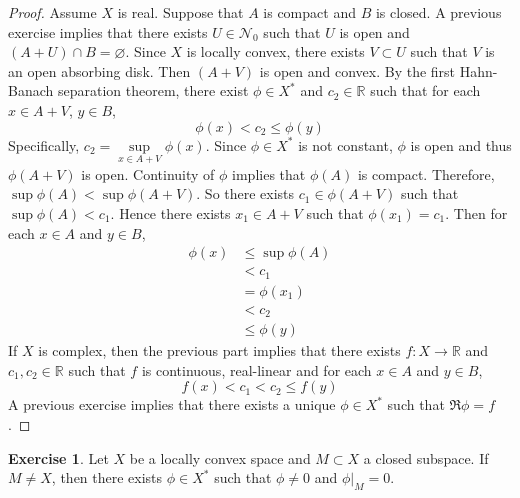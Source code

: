 \documentclass[12pt]{amsart}
\theoremstyle{definition}
\newtheorem{ex}[definition]{Exercise}
\newcommand{\R}{\mathbb{R}}
\newcommand{\MN}{\mathcal{N}}
\DeclareMathOperator*{\0}{\mbf{0}}
\DeclareMathOperator*{\1}{\mbf{1}}
\begin{document}
	\begin{proof}
		Assume $X$ is real. Suppose that $A$ is compact and $B$ is closed. A previous exercise implies that there exists $U \in \MN_0$ such that $U$ is open and $(A + U) \cap B = \varnothing$. Since $X$ is locally convex, there exists $V \subset U$ such that $V$ is an open  absorbing disk. Then $(A + V)$ is open and convex. By the first Hahn-Banach separation theorem, there exist $\phi \in X^*$ and $c_2 \in \R$ such that for each $x \in A + V$, $y \in B$, $$\phi(x) < c_2 \leq \phi(y)$$
		Specifically, $c_2 = \sup\limits_{x \in A + V} \phi(x)$. Since $\phi \in X^*$ is not constant, $\phi$ is open and thus $\phi(A + V)$ is open. Continuity of $\phi$ implies that $\phi(A)$ is compact. Therefore, $\sup \phi(A) < \sup \phi(A + V)$. So there exists $c_1 \in \phi(A + V)$ such that $\sup \phi(A) < c_1$. Hence there exists $x_1 \in A + V$ such that $\phi(x_1) = c_1$. Then for each $x \in A$ and $y \in B$, 
		\begin{align*}
			\phi(x) 
			&\leq \sup \phi(A) \\
			&< c_1 \\
			&= \phi(x_1) \\
			&< c_2 \\
			& \leq \phi(y)
		\end{align*}
	If $X$ is complex, then the previous part implies that there exists $f:X \rightarrow \R$ and $c_1, c_2 \in \R$ such that $f$ is continuous, real-linear and for each $x \in A$ and $y \in B$, 
	$$f(x) < c_1 < c_2 \leq f(y)$$ 
	A previous exercise implies that there exists a unique $\phi \in X^*$ such that $\Re \phi = f$.
	\end{proof}


	\begin{ex}
		Let $X$ be a locally convex space and $M \subset X$ a closed subspace. If $M \neq X$, then there exists $\phi \in X^*$ such that $\phi \neq 0$ and $\phi|_M = 0$. 
	\end{ex}
\end{document}
